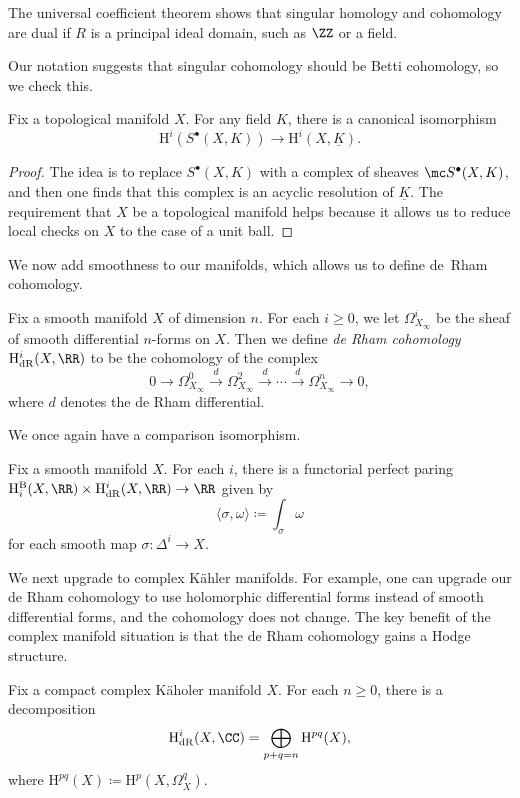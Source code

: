 \documentclass[../thesis.tex]{subfiles}
\begin{document}
\begin{remark}
	The universal coefficient theorem shows that singular homology and cohomology are dual if $R$ is a principal ideal domain, such as $\ZZ$ or a field.
\end{remark}
Our notation suggests that singular cohomology should be Betti cohomology, so we check this.
\begin{theorem}
	Fix a topological manifold $X$. For any field $K$, there is a canonical isomorphism
	\[\mathrm H^i(S^\bullet(X,K))\to\mathrm H^i(X,\underline K).\]
\end{theorem}
\begin{proof}
	The idea is to replace $S^\bullet(X,K)$ with a complex of sheaves $\mc S^\bullet(X,K)$, and then one finds that this complex is an acyclic resolution of $\underline K$. The requirement that $X$ be a topological manifold helps because it allows us to reduce local checks on $X$ to the case of a unit ball.
\end{proof}
We now add smoothness to our manifolds, which allows us to define de~Rham cohomology.
\begin{defihelper} 
	Fix a smooth manifold $X$ of dimension $n$. For each $i\ge0$, we let $\Omega_{X_\infty}^i$ be the sheaf of smooth differential $n$-forms on $X$. Then we define \textit{de Rham cohomology} $\mathrm H^i_{\mathrm{dR}}(X,\RR)$ to be the cohomology of the complex
	\[0\to\Omega_{X_\infty}^0\stackrel d\to\Omega_{X_\infty}^2\stackrel d\to\cdots\stackrel d\to\Omega_{X_\infty}^n\to0,\]
	where $d$ denotes the de Rham differential.
\end{defihelper}
We once again have a comparison isomorphism.
\begin{theorem}
	Fix a smooth manifold $X$. For each $i$, there is a functorial perfect paring $\mathrm H_i^{\mathrm B}(X,\RR)\times\mathrm H^i_{\mathrm{dR}}(X,\RR)\to\RR$ given by
	\[\langle\sigma,\omega\rangle\coloneqq\int_\sigma\omega\]
	for each smooth map $\sigma\colon\Delta^i\to X$.
\end{theorem}
We next upgrade to complex K\"ahler manifolds. For example, one can upgrade our de Rham cohomology to use holomorphic differential forms instead of smooth differential forms, and the cohomology does not change. The key benefit of the complex manifold situation is that the de Rham cohomology gains a Hodge structure.
\begin{theorem}
	Fix a compact complex K\"aholer manifold $X$. For each $n\ge0$, there is a decomposition
	\[\mathrm H^i_{\mathrm{dR}}(X,\CC)=\bigoplus_{p+q=n}\mathrm H^{pq}(X),\]
	where $\mathrm H^{pq}(X)\coloneqq\mathrm H^p(X,\Omega^q_X)$.
\end{theorem}
\end{document}
